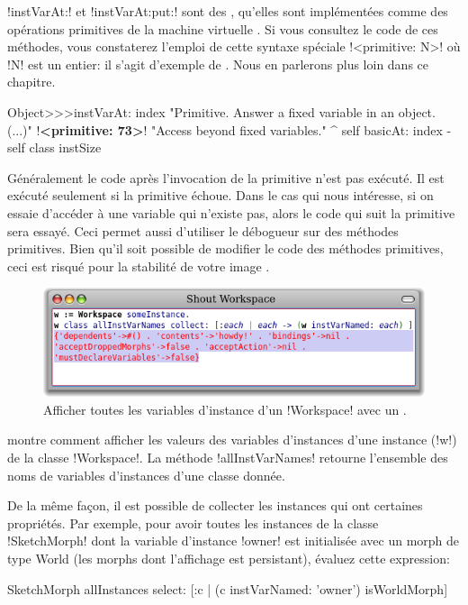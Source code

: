 \documentclass[a4paper,10pt,twoside]{book}
\begin{document}
\ct!instVarAt:! et \ct!instVarAt:put:! sont des , \ie qu'elles sont implémentées comme des opérations primitives de la machine virtuelle \pharo.
Si vous consultez le code de ces méthodes, vous constaterez l'emploi de cette
syntaxe spéciale
\ct!<primitive: N>! où \ct!N! est un entier:
il s'agit d'exemple de . Nous en parlerons plus loin dans ce chapitre. %

\begin{code}{}
Object>>>instVarAt: index 
	"Primitive. Answer a fixed variable in an object. (...)"
	!\textbf{<primitive: 73>}!
	"Access beyond fixed variables."
	^ self basicAt: index - self class instSize		
\end{code}

Généralement le code après l'invocation de la primitive n'est pas exécuté. Il est exécuté seulement si la primitive échoue. Dans le cas qui nous intéresse, si on essaie d'accéder à une variable qui n'existe pas, alors le code qui suit la primitive sera essayé. Ceci permet aussi d'utiliser le débogueur sur des méthodes primitives.
Bien qu'il soit possible de modifier le code des méthodes primitives, ceci est risqué pour la stabilité de votre image \pharo.

\begin{figure}[ht]\centering
	\includegraphics[width=\linewidth]{allInstanceVariables}
	\caption{Afficher toutes les variables d'instance d'un \ct!Workspace! avec un .}
\end{figure}

 montre comment afficher les valeurs des variables d'instances d'une instance (\ct!w!)  de la classe \ct!Workspace!.
La méthode \ct!allInstVarNames! retourne l'ensemble des noms de variables d'instances d'une classe donnée.

De la même façon, il est possible de collecter les instances qui ont certaines propriétés.
Par exemple, pour avoir toutes les instances de la classe \ct!SketchMorph! dont la variable d'instance \ct!owner! est initialisée avec un morph de type World (\ie les morphs dont l'affichage est persistant), évaluez cette expression:
\begin{code}{}
SketchMorph allInstances select: [:c | (c instVarNamed: 'owner') isWorldMorph]
\end{code}
\end{document}
